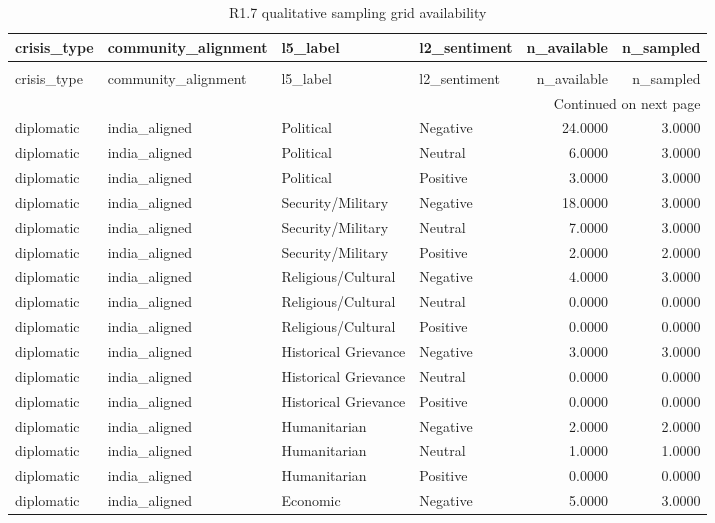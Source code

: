 \begin{longtable}{llllrr}
\caption{R1.7 qualitative sampling grid availability} \label{tab:r1r2_vignette_grid} \\
\toprule
crisis\_type & community\_alignment & l5\_label & l2\_sentiment & n\_available & n\_sampled \\
\midrule
\endfirsthead
\caption[]{R1.7 qualitative sampling grid availability} \\
\toprule
crisis\_type & community\_alignment & l5\_label & l2\_sentiment & n\_available & n\_sampled \\
\midrule
\endhead
\midrule
\multicolumn{6}{r}{Continued on next page} \\
\midrule
\endfoot
\bottomrule
\endlastfoot
diplomatic & india\_aligned & Political & Negative & 24.0000 & 3.0000 \\
diplomatic & india\_aligned & Political & Neutral & 6.0000 & 3.0000 \\
diplomatic & india\_aligned & Political & Positive & 3.0000 & 3.0000 \\
diplomatic & india\_aligned & Security/Military & Negative & 18.0000 & 3.0000 \\
diplomatic & india\_aligned & Security/Military & Neutral & 7.0000 & 3.0000 \\
diplomatic & india\_aligned & Security/Military & Positive & 2.0000 & 2.0000 \\
diplomatic & india\_aligned & Religious/Cultural & Negative & 4.0000 & 3.0000 \\
diplomatic & india\_aligned & Religious/Cultural & Neutral & 0.0000 & 0.0000 \\
diplomatic & india\_aligned & Religious/Cultural & Positive & 0.0000 & 0.0000 \\
diplomatic & india\_aligned & Historical Grievance & Negative & 3.0000 & 3.0000 \\
diplomatic & india\_aligned & Historical Grievance & Neutral & 0.0000 & 0.0000 \\
diplomatic & india\_aligned & Historical Grievance & Positive & 0.0000 & 0.0000 \\
diplomatic & india\_aligned & Humanitarian & Negative & 2.0000 & 2.0000 \\
diplomatic & india\_aligned & Humanitarian & Neutral & 1.0000 & 1.0000 \\
diplomatic & india\_aligned & Humanitarian & Positive & 0.0000 & 0.0000 \\
diplomatic & india\_aligned & Economic & Negative & 5.0000 & 3.0000 \\

\end{longtable}
